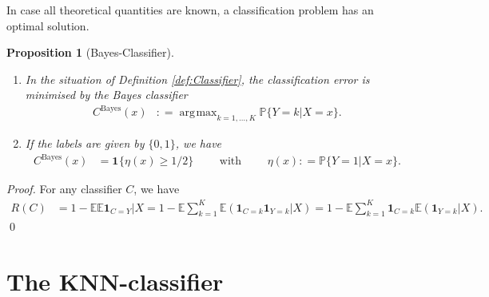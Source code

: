 \documentclass[a4paper,11pt]{article} %
\numberwithin{equation}{section}
\DeclareMathOperator*{\argmax}{arg\!\max}
\renewenvironment{proof}
  {{\noindent \itshape \color{gruvblue} Proof. }}{\color{gruvblue}\qed}
\theoremstyle{ndefinition}
\theoremstyle{nremark}
\theoremstyle{nplain}
\newtheorem{prp}[defi]{Proposition}
\begin{document}
In case all theoretical quantities are known, a classification problem has an
optimal solution.
\begin{prp}[Bayes-Classifier]%
  \label{prp:BayesClassifier}
  \
  \begin{enumerate}[label=(\roman*)]
    \item In the situation of Definition \ref{def:Classifier}, the
      classification error is minimised by the Bayes classifier
      \begin{align*}
        C^{\text{Bayes}}(x) 
        & : = \argmax_{k = 1, \dots, K} \mathbb{P} \{ Y = k | X = x \}. 
      \end{align*}
    \item If the labels are given by \( \{ 0, 1 \} \), we have
      \begin{align*}
        C^{\text{Bayes}}(x) 
        & = \mathbf{1}_{} \{ \eta(x) \ge 1 / 2 \} 
        \qquad \text{ with } \qquad 
        \eta(x) : = \mathbb{P} \{ Y = 1 | X = x \}.
      \end{align*}
  \end{enumerate}
\end{prp}%
\begin{proof}%
  For any classifier \( C \), we have
  \begin{align*}
    R(C) 
    & =   1 - \mathbb{E} \mathbb{E} \mathbf{1}_{C = Y} | X 
      =   1 
          - \mathbb{E} \sum_{k = 1}^{K} 
            \mathbb{E} ( \mathbf{1}_{C = k} \mathbf{1}_{Y = k} | X ) 
      =   1 
          - \mathbb{E} \sum_{k = 1}^{K} 
            \mathbf{1}_{C = k}  
            \mathbb{E} ( \mathbf{1}_{Y = k} | X ). 
  \end{align*}
\end{proof}%


\section{The KNN-classifier}%
\label{sec:TheKNNClassifier}
\end{document}
